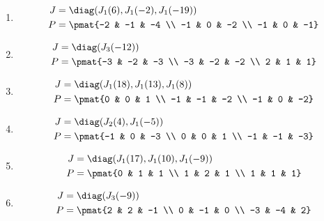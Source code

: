 \begin{enumerate}
\item

\begin{align*}
J &= \diag(J_{1}(6), J_{1}(-2), J_{1}(-19))\\
P &= \pmat{-2 & -1 & -4 \\ -1 & 0 & -2 \\ -1 & 0 & -1}
\end{align*}

\item

\begin{align*}
J &= \diag(J_{3}(-12))\\
P &= \pmat{-3 & -2 & -3 \\ -3 & -2 & -2 \\ 2 & 1 & 1}
\end{align*}

\item

\begin{align*}
J &= \diag(J_{1}(18), J_{1}(13), J_{1}(8))\\
P &= \pmat{0 & 0 & 1 \\ -1 & -1 & -2 \\ -1 & 0 & -2}
\end{align*}

\item

\begin{align*}
J &= \diag(J_{2}(4), J_{1}(-5))\\
P &= \pmat{-1 & 0 & -3 \\ 0 & 0 & 1 \\ -1 & -1 & -3}
\end{align*}

\item

\begin{align*}
J &= \diag(J_{1}(17), J_{1}(10), J_{1}(-9))\\
P &= \pmat{0 & 1 & 1 \\ 1 & 2 & 1 \\ 1 & 1 & 1}
\end{align*}

\item

\begin{align*}
J &= \diag(J_{3}(-9))\\
P &= \pmat{2 & 2 & -1 \\ 0 & -1 & 0 \\ -3 & -4 & 2}
\end{align*}


\end{enumerate}
